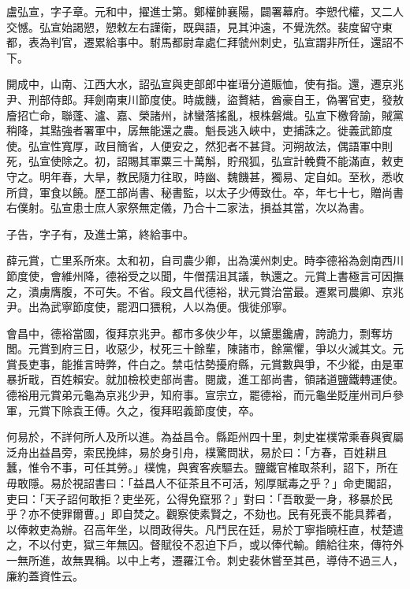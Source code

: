 \begin{pinyinscope}
 盧弘宣，字子章。元和中，擢進士第。鄭權帥襄陽，闢署幕府。李愬代權，又二人交憾。弘宣始謁愬，愬敕左右謹衛，既與語，見其沖遠，不覺洗然。裴度留守東都，表為判官，遷累給事中。駙馬都尉韋處仁拜虢州刺史，弘宣謂非所任，還詔不下。



 開成中，山南、江西大水，詔弘宣與吏部郎中崔瑨分道賑恤，使有指。還，遷京兆尹、刑部侍郎。拜劍南東川節度使。時歲饑，盜贅結，酋豪自王，偽署官吏，發敖廥招亡命，聯蓬、瀘、嘉、榮諸州，訹蠻落搖亂，根株磐熾。弘宣下檄脅諭，賊黨稍降，其黠強者署軍中，孱無能還之農。魁長逃入峽中，吏捕誅之。徙義武節度使。弘宣性寬厚，政目簡省，人便安之，然犯者不甚貸。河朔故法，偶語軍中則死，弘宣使除之。初，詔賜其軍粟三十萬斛，貯飛狐，弘宣計輓費不能滿直，敕吏守之。明年春，大旱，教民隨力往取，時幽、魏饑甚，獨易、定自如。至秋，悉收所貸，軍食以饒。歷工部尚書、秘書監，以太子少傅致仕。卒，年七十七，贈尚書右僕射。弘宣患士庶人家祭無定儀，乃合十二家法，損益其當，次以為書。



 子告，字子有，及進士第，終給事中。



 薛元賞，亡里系所來。太和初，自司農少卿，出為漢州刺史。時李德裕為劍南西川節度使，會維州降，德裕受之以聞，牛僧孺沮其議，執還之。元賞上書極言可因撫之，潰虜膺腹，不可失。不省。段文昌代德裕，狀元賞治當最。遷累司農卿、京兆尹。出為武寧節度使，罷泗口猥稅，人以為便。俄徙邠寧。



 會昌中，德裕當國，復拜京兆尹。都市多俠少年，以黛墨鑱膚，誇詭力，剽奪坊閭。元賞到府三日，收惡少，杖死三十餘輩，陳諸市，餘黨懼，爭以火滅其文。元賞長吏事，能推言時弊，件白之。禁屯怙勢擾府縣，元賞數與爭，不少縱，由是軍暴折戢，百姓賴安。就加檢校吏部尚書。閱歲，進工部尚書，領諸道鹽鐵轉運使。德裕用元賞弟元龜為京兆少尹，知府事。宣宗立，罷德裕，而元龜坐貶崖州司戶參軍，元賞下除袁王傅。久之，復拜昭義節度使，卒。



 何易於，不詳何所人及所以進。為益昌令。縣距州四十里，刺史崔樸常乘春與賓屬泛舟出益昌旁，索民挽繂，易於身引舟，樸驚問狀，易於曰：「方春，百姓耕且蠶，惟令不事，可任其勞。」樸愧，與賓客疾驅去。鹽鐵官榷取茶利，詔下，所在毋敢隱。易於視詔書曰：「益昌人不征茶且不可活，矧厚賦毒之乎？」命吏閣詔，吏曰：「天子詔何敢拒？吏坐死，公得免竄邪？」對曰：「吾敢愛一身，移暴於民乎？亦不使罪爾曹。」即自焚之。觀察使素賢之，不劾也。民有死喪不能具葬者，以俸敕吏為辦。召高年坐，以問政得失。凡鬥民在廷，易於丁寧指曉枉直，杖楚遣之，不以付吏，獄三年無囚。督賦役不忍迫下戶，或以俸代輸。饋給往來，傳符外一無所進，故無異稱。以中上考，遷羅江令。刺史裴休嘗至其邑，導侍不過三人，廉約蓋資性云。



\end{pinyinscope}